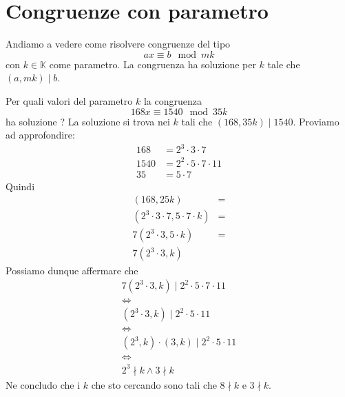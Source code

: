 \section{Congruenze con parametro}
Andiamo a vedere come risolvere congruenze del tipo
\begin{equation*}
	ax \equiv b \mod{mk}
\end{equation*}
con $k \in \mathbb{K}$ come parametro. La congruenza ha soluzione per $k$ tale che
$(a, mk) \mid b$.

\begin{example}
	Per quali valori del parametro $k$ la congruenza
	\begin{equation*}
		168x \equiv 1540 \mod{35k}
	\end{equation*}
	ha soluzione ?
	La soluzione si trova nei $k$ tali che $(168, 35k) \mid 1540$.
	Proviamo ad approfondire:
	\begin{equation*}
		\begin{array}{ll}
			168  & = 2^3 \cdot 3 \cdot 7          \\
			1540 & = 2^2 \cdot 5 \cdot 7 \cdot 11 \\
			35   & = 5 \cdot 7
		\end{array}
	\end{equation*}
	Quindi
	\begin{equation*}
		\begin{array}{ll}
			(168, 25k)                               & = \\
			(2^3 \cdot 3 \cdot 7, 5 \cdot 7 \cdot k) & = \\
			7 (2^3 \cdot 3, 5 \cdot k)               & = \\
			7 (2^3 \cdot 3, k)
		\end{array}
	\end{equation*}
	Possiamo dunque affermare che
	\begin{equation*}
		\begin{array}{c}
			7 (2^3 \cdot 3, k) \mid 2^2 \cdot 5 \cdot 7 \cdot 11 \\
			\Leftrightarrow                                      \\
			(2^3 \cdot 3, k) \mid 2^2 \cdot 5 \cdot 11           \\
			\Leftrightarrow                                      \\
			(2^3, k) \cdot (3, k) \mid 2^2 \cdot 5 \cdot 11      \\
			\Leftrightarrow                                      \\
			2^3 \nmid k \wedge 3 \nmid k
		\end{array}
	\end{equation*}
	Ne concludo che i $k$ che sto cercando sono tali che $8 \nmid k$ e $3 \nmid k$.
\end{example}

